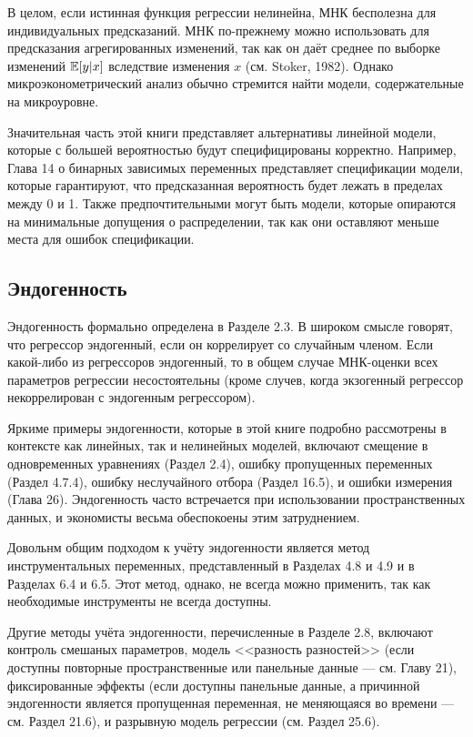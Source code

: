В целом, если истинная функция регрессии нелинейна, МНК бесполезна для индивидуальных предсказаний. МНК по-прежнему можно использовать для предсказания агрегированных изменений, так как он даёт среднее по выборке изменений $\mathbb{E} [y|x]$ вследствие изменения $x$ (см. Stoker, 1982). Однако микроэконометрический анализ обычно стремится найти модели, содержательные на микроуровне.

Значительная часть этой книги представляет альтернативы линейной модели, которые с большей вероятностью будут специфицированы корректно. Например, Глава 14 о бинарных зависимых переменных представляет спецификации модели, которые гарантируют, что предсказанная вероятность будет лежать в пределах между 0 и 1. Также предпочтительными могут быть модели, которые опираются на минимальные допущения о распределении, так как они оставляют меньше места для ошибок спецификации.

\subsection{Эндогенность}
Эндогенность формально определена в Разделе 2.3. В широком смысле говорят, что регрессор эндогенный, если он коррелирует со случайным членом. Если какой-либо из регрессоров эндогенный, то в общем случае МНК-оценки всех параметров регрессии несостоятельны (кроме случев, когда экзогенный регрессор некоррелирован с эндогенным регрессором). 

Яркиме примеры эндогенности, которые в этой книге подробно рассмотрены в контексте как линейных, так и нелинейных моделей, включают смещение в одновременных уравнениях (Раздел 2.4), ошибку пропущенных переменных (Раздел 4.7.4), ошибку неслучайного отбора (Раздел 16.5), и ошибки измерения (Глава 26). Эндогенность часто встречается при использовании пространственных данных, и экономисты весьма обеспокоены этим затруднением.

Довольнм общим подходом к учёту эндогенности является метод инструментальных переменных, представленный в Разделах 4.8 и 4.9 и в Разделах 6.4 и 6.5.  Этот метод, однако, не всегда можно применить, так как необходимые инструменты не всегда доступны.

Другие методы учёта эндогенности, перечисленные в Разделе 2.8, включают контроль смешаных параметров, модель <<разность разностей>> (если доступны повторные пространственные или панельные данные --- см. Главу 21), фиксированные эффекты (если доступны панельные данные, а причинной эндогенности является пропущенная переменная, не меняющаяся во времени --- см. Раздел 21.6), и разрывную модель регрессии (см. Раздел 25.6).

